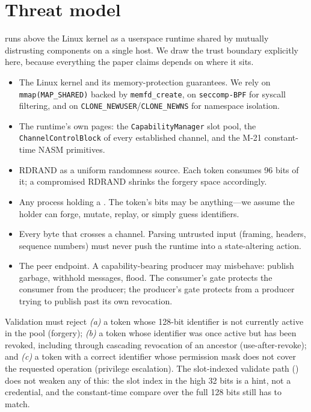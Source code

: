 \section{Threat model}
\label{sec:threat}

\sysname runs above the Linux kernel as a userspace runtime shared by
mutually distrusting components on a single host. We draw the trust
boundary explicitly here, because everything the paper claims depends
on where it sits.

\begin{itemize}
\itemsep0pt
\item The Linux kernel and its memory-protection guarantees. We rely
on \texttt{mmap(MAP\_SHARED)} backed by \texttt{memfd\_create}, on
\texttt{seccomp-BPF} for syscall filtering, and on
\texttt{CLONE\_NEWUSER}/\texttt{CLONE\_NEWNS} for namespace isolation.
\item The runtime's own pages: the \texttt{CapabilityManager} slot
pool, the \texttt{ChannelControlBlock} of every established channel,
and the M-21 constant-time NASM primitives.
\item RDRAND as a uniform randomness source. Each token consumes 96
bits of it; a compromised RDRAND shrinks the forgery space
accordingly.
\end{itemize}

\begin{itemize}
\itemsep0pt
\item Any process holding a \captoken. The token's bits may be
anything---we assume the holder can forge, mutate, replay, or simply
guess identifiers.
\item Every byte that crosses a channel. Parsing untrusted input
(framing, headers, sequence numbers) must never push the runtime into
a state-altering action.
\item The peer endpoint. A capability-bearing producer may misbehave:
publish garbage, withhold messages, flood. The consumer's gate
protects the consumer from the producer; the producer's gate protects
\sysname from a producer trying to publish past its own revocation.
\end{itemize}

Validation must reject
\textit{(a)} a token whose 128-bit identifier is not currently active
in the pool (forgery);
\textit{(b)} a token whose identifier was once active but has been
revoked, including through cascading revocation of an ancestor
(use-after-revoke); and
\textit{(c)} a token with a correct identifier whose permission mask
does not cover the requested operation (privilege escalation).
The slot-indexed validate path () does not
weaken any of this: the slot index in the high 32 bits is a hint, not
a credential, and the constant-time compare over the full 128 bits
still has to match.

